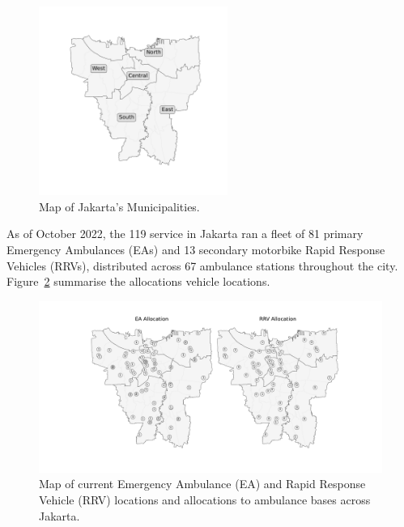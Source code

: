 \documentclass[preprint,12pt]{elsarticle}
\begin{document}
\begin{figure}
\begin{center}
\includegraphics[width=0.55\textwidth,trim={0 6cm 0 5cm}, clip]{img/jakarta_region_names.pdf}
\end{center}
\caption{Map of Jakarta's Municipalities.}
\label{fig:region_names}
\end{figure}

As of October 2022, the 119 service in Jakarta ran a fleet of 81 primary
Emergency Ambulances (EAs) and 13 secondary motorbike Rapid Response Vehicles
(RRVs), distributed across 67 ambulance stations throughout the city.
Figure~\ref{fig:current_allocation} summarise the allocations vehicle
locations.

\begin{figure}
\begin{center}
\includegraphics[width=\textwidth]{img/map_current}
\caption{Map of current Emergency Ambulance (EA) and Rapid Response Vehicle
         (RRV) locations and allocations to ambulance bases across Jakarta.}
\label{fig:current_allocation}
\end{center}
\end{figure}
\end{document}
